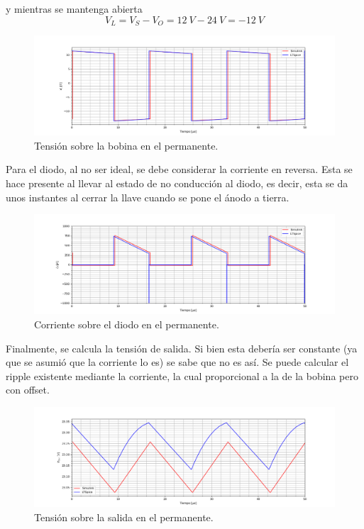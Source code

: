 y mientras se mantenga abierta
\begin{equation*}
	V_L = V_S - V_O = 12 \ V - 24 \ V = -12 \ V
\end{equation*}

\begin{figure}[H]
	\centering
	\includegraphics[width=\linewidth]{ImagenesEjercicio-2/vl.png}
	\caption{Tensión sobre la bobina en el permanente.}
	\label{fig:ej2:vl}
\end{figure}

Para el diodo, al no ser ideal, se debe considerar la corriente en reversa. Esta se hace presente al llevar al estado de no conducción al diodo, es decir, esta se da unos instantes al cerrar la llave cuando se pone el ánodo a tierra.

\begin{figure}[H]
	\centering
	\includegraphics[width=\linewidth]{ImagenesEjercicio-2/id.png}
	\caption{Corriente sobre el diodo en el permanente.}
	\label{fig:ej2:id}
\end{figure}

Finalmente, se calcula la tensión de salida. Si bien esta debería ser constante (ya que se asumió que la corriente lo es) se sabe que no es así. Se puede calcular el ripple existente mediante la corriente, la cual proporcional a la de la bobina pero con offset.

\begin{figure}[H]
	\centering
	\includegraphics[width=\linewidth]{ImagenesEjercicio-2/vout.png}
	\caption{Tensión sobre la salida en el permanente.}
	\label{fig:ej2:vout}
\end{figure}




